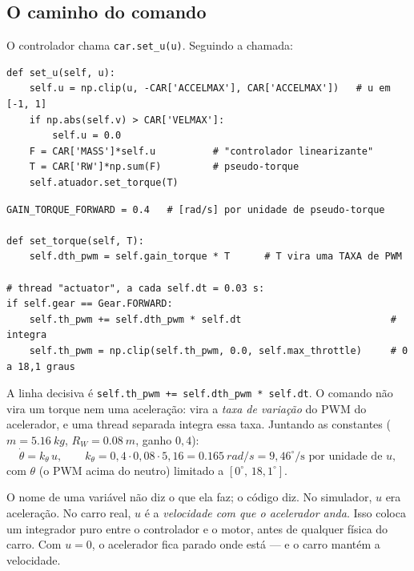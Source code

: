 \documentclass[11pt,a4paper,oneside,openany]{book}
\newcommand{\code}[1]{\texttt{#1}}
\begin{document}
\subsection{O caminho do comando}

O controlador chama \code{car.set\_u(u)}. Seguindo a chamada:

\begin{lstlisting}[title={\small\code{veiculo\_real/fva\_car/car.py}}]
def set_u(self, u):
    self.u = np.clip(u, -CAR['ACCELMAX'], CAR['ACCELMAX'])   # u em [-1, 1]
    if np.abs(self.v) > CAR['VELMAX']:
        self.u = 0.0
    F = CAR['MASS']*self.u          # "controlador linearizante"
    T = CAR['RW']*np.sum(F)         # pseudo-torque
    self.atuador.set_torque(T)
\end{lstlisting}

\begin{lstlisting}[title={\small\code{veiculo\_real/fva\_car/servos.py}}]
GAIN_TORQUE_FORWARD = 0.4   # [rad/s] por unidade de pseudo-torque

def set_torque(self, T):
    self.dth_pwm = self.gain_torque * T      # T vira uma TAXA de PWM

# thread "actuator", a cada self.dt = 0.03 s:
if self.gear == Gear.FORWARD:
    self.th_pwm += self.dth_pwm * self.dt                          # integra
    self.th_pwm = np.clip(self.th_pwm, 0.0, self.max_throttle)     # 0 a 18,1 graus
\end{lstlisting}

A linha decisiva é \code{self.th\_pwm += self.dth\_pwm * self.dt}. O comando não vira
um torque nem uma aceleração: vira a \emph{taxa de variação} do PWM do acelerador, e uma
thread separada integra essa taxa. Juntando as constantes ($m = \SI{5,16}{kg}$,
$R_W = \SI{0,08}{m}$, ganho $0{,}4$):
\begin{equation}
  \dot\theta = k_\theta\, u, \qquad k_\theta = 0{,}4 \cdot 0{,}08 \cdot 5{,}16
  = \SI{0,165}{rad/s} = 9{,}46^\circ\!/\mathrm{s} \text{ por unidade de } u,
  \label{eq:integrador}
\end{equation}
com $\theta$ (o PWM acima do neutro) limitado a $[0^\circ,\,18{,}1^\circ]$.

\begin{ideia}
O nome de uma variável não diz o que ela faz; o código diz. No simulador, $u$ era
aceleração. No carro real, $u$ é a \emph{velocidade com que o acelerador anda}. Isso
coloca um integrador puro entre o controlador e o motor, antes de qualquer física do
carro. Com $u = 0$, o acelerador fica parado onde está --- e o carro mantém a velocidade.
\end{ideia}
\end{document}
